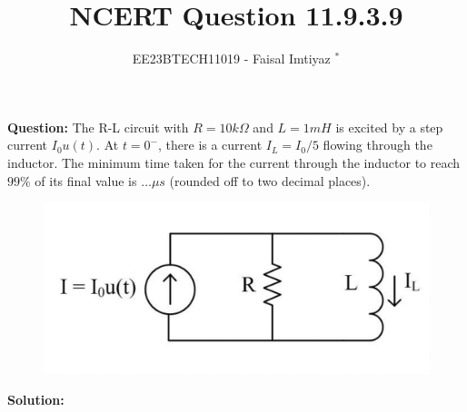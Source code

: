 \documentclass[journal,12pt,twocolumn]{IEEEtran}
\theoremstyle{remark}
\begin{document}

\vspace{3cm}
\title{NCERT Question 11.9.3.9}
\author{EE23BTECH11019 - Faisal Imtiyaz $^{*}$%
}
\maketitle
\newpage
\bigskip

\renewcommand{\thefigure}{\arabic{figure}}
\renewcommand{\thetable}{\arabic{table}}


\vspace{3cm}
\textbf{Question:}
The R-L circuit with $R=10 k\Omega$ and $L=1 mH$ is excited by a step current $I_0u(t)$. At $t=0^-$, there is a current $I_L=I_0/5$ flowing through the inductor. The minimum time taken for the current through the inductor to reach $99\%$ of its final value is $\ldots \mu s$
(rounded off to two decimal places).\\
\begin{figure}[h!]
    \centering
    \includegraphics[width=0.8\columnwidth]{47.png}
\end{figure}
\textbf{Solution:}\\
{}

\end{document}
